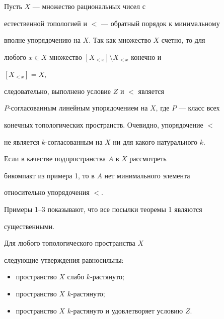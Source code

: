 \begin{exam} Пусть $X$ --- множество рациональных чисел с 


естественной топологией и $<$ --- обратный порядок к минимальному  


вполне упорядочению на $X$. Так как множество $X$ счетно, то для  


любого $x\in X$ множество $[X_{<x}]\setminus X_{<x}$ конечно и 


$[X_{<x}]=X$, 


следовательно, выполнено условие $Z$ и $<$ является 


$P$-согласованным линейным упорядочением на $X$, где $P$ --- класс всех  


конечных топологических пространств. Очевидно, упорядочение $<$  


не является $k$-согласованным на $X$ ни для какого натурального $k$.  


Если в качестве подпространства $A$ в $X$ рассмотреть  


бикомпакт из примера 1, то в $A$ нет минимального элемента  


относительно упорядочения $<$. 


\end{exam} 


 


Примеры 1--3 показывают, что все посылки теоремы 1 являются  


существенными. 


 


\begin{thm} 


Для любого топологического пространства $X$  


следующие утверждения рав\-но\-сильны$:$ 


\begin{itemize} 


\item[1.] пространство $X$ слабо $k$-растянуто$;$ 


\item[2.] пространство $X$\; $k$-растянуто$;$ 


\item[3.] пространство $X$\; $k$-растянуто и удовлетворяет условию $Z$.  


\end{itemize} 


\end{thm} 


